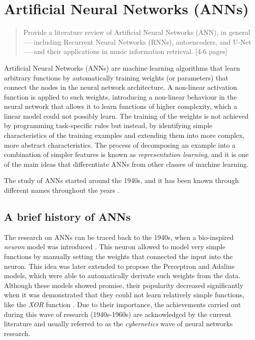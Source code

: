 \chapter{Artificial Neural Networks (ANNs)}
\label{chap:chap20}

\begin{quote}
    Provide a literature review of Artificial Neural Networks (ANN), in general—--including Recurrent Neural Networks (RNNs), autoencoders, and U-Net—--and their applications in music information retrieval. [4-6 pages]
\end{quote}
\clearpage

Artificial Neural Networks (ANNs) are machine learning algorithms that learn arbitrary functions by automatically training weights (or parameters) that connect the nodes in the neural network architecture. A non-linear activation function is applied to such weights, introducing a non-linear behaviour in the neural network that allows it to learn functions of higher complexity, which a linear model could not possibly learn. The training of the weights is not achieved by programming task-specific rules but instead, by identifying simple characteristics of the training examples and extending them into more complex, more abstract characteristics. The process of decomposing an example into a combination of simpler features is known as \emph{representation learning}, and it is one of the main ideas that differentiate ANNs from other classes of machine learning. 

The study of ANNs started around the 1940s, and it has been known through different names throughout the years \cite{goodfellow_deep_2016}.

\section{A brief history of ANNs}

The research on ANNs can be traced back to the 1940s, when a bio-inspired \emph{neuron} model was introduced \cite{mcculloch_logical_1943}. This neuron allowed to model very simple functions by manually setting the weights that connected the input into the neuron. This idea was later extended to propose the Perceptron \cite{rosenblatt_perceptron:_1958} and Adaline \cite{widrow_adaptive_1960} models, which were able to automatically derivate such weights from the data. Although these models showed promise, their popularity decreased significantly when it was demonstrated that they could not learn relatively simple functions, like the \emph{XOR} function \cite{minsky_perceptrons:_1972}. Due to their importance, the achievements carried out during this wave of research (1940s-1960s) are acknowledged by the current literature \cite{goodfellow_deep_2016} and usually referred to as the \emph{cybernetics} wave of neural networks research.

